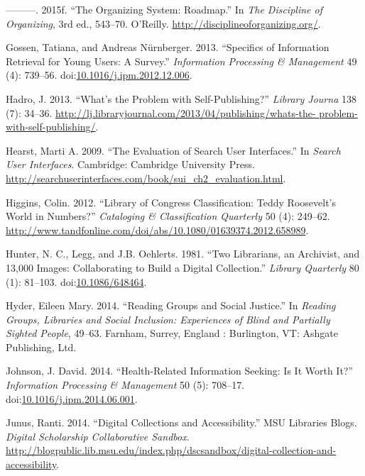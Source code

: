 \documentclass[]{article}
\begin{document}
\hypertarget{ref-glushkoux5forganizingux5f2015}{}
---------. 2015f. ``The Organizing System: Roadmap.'' In \emph{The
Discipline of Organizing}, 3rd ed., 543--70. O'Reilly.
\url{http://disciplineoforganizing.org/}.

\hypertarget{ref-gossenux5fspecificsux5f2013}{}
Gossen, Tatiana, and Andreas Nürnberger. 2013. ``Specifics of
Information Retrieval for Young Users: A Survey.'' \emph{Information
Processing \& Management} 49 (4): 739--56.
doi:\href{https://doi.org/10.1016/j.ipm.2012.12.006}{10.1016/j.ipm.2012.12.006}.

\hypertarget{ref-hadroux5fwhatsux5f2013}{}
Hadro, J. 2013. ``What's the Problem with Self-Publishing?''
\emph{Library Journa} 138 (7): 34--36.
\href{http://lj.libraryjournal.com/2013/04/publishing/whats-the-\%20problem-with-self-publishing/}{http://lj.libraryjournal.com/2013/04/publishing/whats-the- problem-with-self-publishing/}.

\hypertarget{ref-hearstux5fevaluationux5f2009}{}
Hearst, Marti A. 2009. ``The Evaluation of Search User Interfaces.'' In
\emph{Search User Interfaces}. Cambridge: Cambridge University Press.
\url{http://searchuserinterfaces.com/book/sui_ch2_evaluation.html}.

\hypertarget{ref-higginsux5flibraryux5f2012}{}
Higgins, Colin. 2012. ``Library of Congress Classification: Teddy
Roosevelt's World in Numbers?'' \emph{Cataloging \& Classification
Quarterly} 50 (4): 249--62.
\url{http://www.tandfonline.com/doi/abs/10.1080/01639374.2012.658989}.

\hypertarget{ref-hunterux5ftwoux5f1981}{}
Hunter, N. C., Legg, and J.B. Oehlerts. 1981. ``Two Librarians, an
Archivist, and 13,000 Images: Collaborating to Build a Digital
Collection.'' \emph{Library Quarterly} 80 (1): 81--103.
doi:\href{https://doi.org/10.1086/648464}{10.1086/648464}.

\hypertarget{ref-hyderux5freadingux5f2014}{}
Hyder, Eileen Mary. 2014. ``Reading Groups and Social Justice.'' In
\emph{Reading Groups, Libraries and Social Inclusion: Experiences of
Blind and Partially Sighted People}, 49--63. Farnham, Surrey, England :
Burlington, VT: Ashgate Publishing, Ltd.

\hypertarget{ref-johnsonux5fhealth-relatedux5f2014}{}
Johnson, J. David. 2014. ``Health-Related Information Seeking: Is It
Worth It?'' \emph{Information Processing \& Management} 50 (5): 708--17.
doi:\href{https://doi.org/10.1016/j.ipm.2014.06.001}{10.1016/j.ipm.2014.06.001}.

\hypertarget{ref-junusux5fdigitalux5f2014}{}
Junus, Ranti. 2014. ``Digital Collections and Accessibility.'' MSU
Libraries Blogs. \emph{Digital Scholarship Collaborative Sandbox}.
\url{http://blogpublic.lib.msu.edu/index.php/dscsandbox/digital-collection-and-accessibility}.
\end{document}
